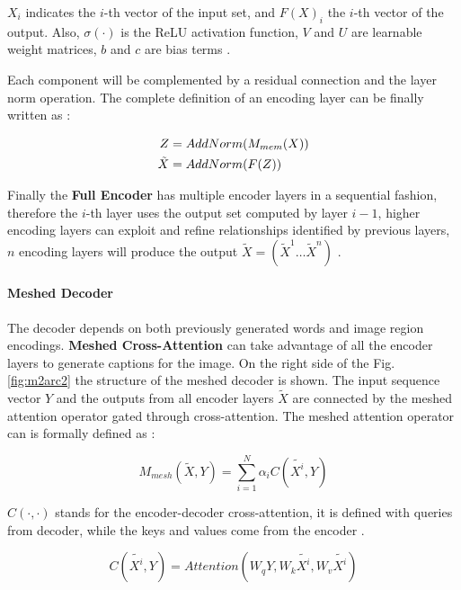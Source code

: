 \documentclass[
]{krantz}
\begin{document}
\(X_i\) indicates the \(i\)-th vector of the input set, and \(F(X)_i\) the \(i\)-th vector of the output. Also, \(\sigma(·)\) is the ReLU activation function, \(V\) and \(U\) are learnable weight matrices, \(b\) and \(c\) are bias terms \citep{cornia2020m2}.

Each component will be complemented by a residual connection and the layer norm operation. The complete definition of an encoding layer can be finally written as \citep{cornia2020m2}:

\begin{align}
Z &= AddNorm(M_{mem}(X))\notag \\
\tilde{X}&=AddNorm(F(Z))
\end{align}

Finally the \textbf{Full Encoder} has multiple encoder layers in a sequential fashion, therefore the \(i\)-th layer uses the output set computed by layer \(i − 1\), higher encoding layers can exploit and refine relationships identified by previous layers, \(n\) encoding layers will produce the output \(\tilde{X} = (\tilde{X}^1 \dots \tilde{X}^n)\) \citep{cornia2020m2}.

\hypertarget{meshed-decoder}{%
\paragraph{Meshed Decoder}\label{meshed-decoder}}

The decoder depends on both previously generated words and image region encodings.
\textbf{Meshed Cross-Attention} can take advantage of all the encoder layers to generate captions for the image. On the right side of the Fig. \ref{fig:m2arc2} the structure of the meshed decoder is shown. The input sequence vector \(Y\) and the outputs from all encoder layers \(\tilde{X}\) are connected by the meshed attention operator gated through cross-attention. The meshed attention operator can is formally defined as \citep{cornia2020m2}:

\begin{equation}
M_{mesh}(\tilde{X}, Y) =\sum_{i = 1}^{N}\alpha_i C(\tilde{X^i}, Y)
\end{equation}

\(C(·,·)\) stands for the encoder-decoder cross-attention, it is defined with queries from decoder, while the keys and values come from the encoder \citep{cornia2020m2}.

\begin{equation}
C(\tilde{X^i}, Y) = Attention(W_q Y, W_k \tilde{X^i}, W_v \tilde{X^i})
\end{equation}
\end{document}
